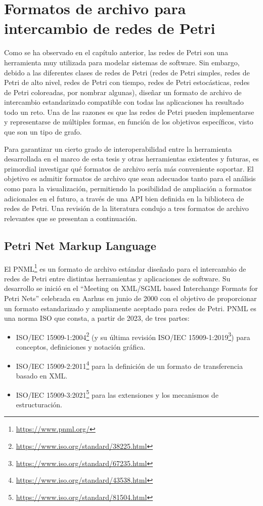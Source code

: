 \section{Formatos de archivo para intercambio de redes de Petri}

Como se ha observado en el capítulo anterior, las redes de Petri son una herramienta muy
utilizada para modelar sistemas de software. Sin embargo, debido a las diferentes clases de
redes de Petri (redes de Petri simples, redes de Petri de alto nivel, redes de Petri con tiempo,
redes de Petri estocásticas, redes de Petri coloreadas, por nombrar algunas), diseñar un
formato de archivo de intercambio estandarizado compatible con todas las aplicaciones ha
resultado todo un reto. Una de las razones es que las redes de Petri pueden implementarse y
representarse de múltiples formas, en función de los objetivos específicos, visto que son un tipo
de grafo.

Para garantizar un cierto grado de interoperabilidad entre la herramienta desarrollada en el
marco de esta tesis y otras herramientas existentes y futuras, es primordial investigar qué
formatos de archivo sería más conveniente soportar. El objetivo es admitir formatos de archivo
que sean adecuados tanto para el análisis como para la visualización, permitiendo la posibilidad
de ampliación a formatos adicionales en el futuro, a través de una API bien definida en la
biblioteca de redes de Petri. Una revisión de la literatura condujo a tres formatos de archivo
relevantes que se presentan a continuación.

\subsection{Petri Net Markup Language}

El \acrfull{PNML}\footnote{\url{https://www.pnml.org/}}
es un formato de archivo estándar diseñado
para el intercambio de redes de Petri entre distintas herramientas y aplicaciones de software. Su
desarrollo se inició en el ``Meeting on XML/SGML based Interchange Formats for Petri Nets''
celebrada en Aarhus en junio de 2000 \cite{jungel2000petri,weber2003petri}
con el objetivo de proporcionar un formato estandarizado y ampliamente
aceptado para redes de Petri. PNML es una norma ISO que consta, a partir de
2023, de tres partes:

\begin{itemize}
      \item ISO/IEC 15909-1:2004\footnote{\url{https://www.iso.org/standard/38225.html}}
            (y su última revisión ISO/IEC 15909-1:2019\footnote{\url{https://www.iso.org/standard/67235.html}})
            para conceptos, definiciones y notación gráfica.
      \item ISO/IEC 15909-2:2011\footnote{\url{https://www.iso.org/standard/43538.html}}
            para la definición de un formato de transferencia basado en XML.
      \item ISO/IEC 15909-3:2021\footnote{\url{https://www.iso.org/standard/81504.html}}
            para las extensiones y los mecanismos de estructuración.
\end{itemize}

